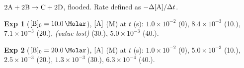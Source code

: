 \documentclass{apchem-exam}
\begin{document}
\begin{rubric}
\end{rubric}


$2\ce{A} + 2\ce{B} \to \ce{C} + 2\ce{D}$,  flooded. Rate defined as
$-\Delta[\ce{A}]/\Delta t$.

\textbf{Exp 1} ($[\ce{B}]_0=\SI{10.0}{\Molar}$), $[\ce{A}]$ (M) at $t$
(s): $1.0\times10^{-2}$ (0), $8.4\times10^{-3}$ (10.), $7.1\times10^{-3}$
(20.), \emph{(value lost)} (30.), $5.0\times10^{-3}$ (40.).

\textbf{Exp 2} ($[\ce{B}]_0=\SI{20.0}{\Molar}$), $[\ce{A}]$ (M) at $t$
(s): $1.0\times10^{-2}$ (0), $5.0\times10^{-3}$ (10.), $2.5\times10^{-3}$
(20.), $1.3\times10^{-3}$ (30.), $6.3\times10^{-4}$ (40.).
\end{document}
